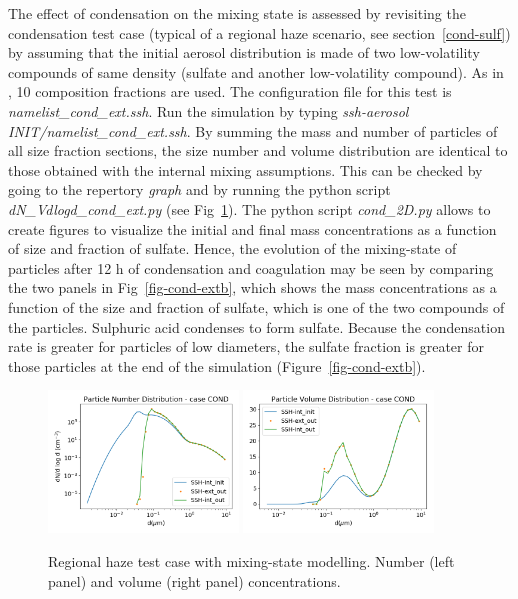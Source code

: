\documentclass[a4paper,11pt]{article}
\begin{document}
The effect of 
condensation on the mixing state is assessed by revisiting the condensation
test case (typical of a regional haze scenario, see section~\ref{cond-sulf}) by assuming
that the initial aerosol distribution is made of two low-volatility compounds
of same density (sulfate and another low-volatility compound).
As in \cite{zhu2015}, 10 composition fractions are used.
The configuration file for this test is {\it{namelist\_cond\_ext.ssh}}.
Run the simulation by typing {\it{ssh-aerosol INIT/namelist\_cond\_ext.ssh}}.
By summing the mass and number of particles of all size fraction sections, the
size number and volume distribution are identical to those obtained with the
internal mixing assumptions. This can be checked by going to the repertory
{\it{graph}} and by running the python script {\it{dN\_Vdlogd\_cond\_ext.py}}
(see Fig~\ref{fig-cond-ext}).
The python script {\it{cond\_2D.py}} allows to create figures to visualize the initial and final mass concentrations as a function of size and fraction of sulfate.
Hence, the evolution of the mixing-state of particles after 12 h of condensation and coagulation may
be seen by comparing the two panels in Fig~\ref{fig-cond-extb}, which shows
the mass concentrations as a function of the size and fraction of
sulfate, which is one of the
two compounds of the particles. 
Sulphuric acid condenses to form
sulfate. Because the condensation rate is greater for particles of
low diameters, the sulfate fraction is greater for those particles at the end
of the simulation (Figure~\ref{fig-cond-extb}).


\begin{figure}[H]
        \begin{center}
                \includegraphics[angle=0,width=0.45\textwidth]{../graph/figure_ref/dNdlogd_COND_EXT.png}
                \includegraphics[angle=0,width=0.45\textwidth]{../graph/figure_ref/dVdlogd_COND_EXT.png}
        \end{center}
\caption{Regional haze test case with mixing-state modelling. Number (left panel) and volume (right panel) concentrations.}
\label{fig-cond-ext}
\end{figure}
 
\end{document}
